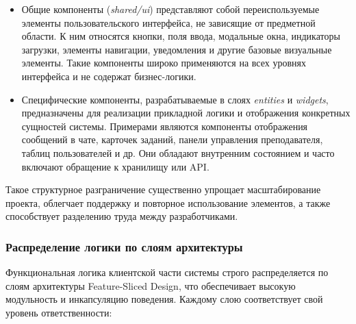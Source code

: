 \begin{itemize}
  \item Общие компоненты (\textit{shared/ui}) представляют собой переиспользуемые элементы пользовательского интерфейса, не зависящие от предметной области. К ним относятся кнопки, поля ввода, модальные окна, индикаторы загрузки, элементы навигации, уведомления и другие базовые визуальные элементы. Такие компоненты широко применяются на всех уровнях интерфейса и не содержат бизнес-логики.
  
  \item Специфические компоненты, разрабатываемые в слоях \textit{entities} и \textit{widgets}, предназначены для реализации прикладной логики и отображения конкретных сущностей системы. Примерами являются компоненты отображения сообщений в чате, карточек заданий, панели управления преподавателя, таблиц пользователей и др. Они обладают внутренним состоянием и часто включают обращение к хранилищу или API.
\end{itemize}

Такое структурное разграничение существенно упрощает масштабирование проекта, облегчает поддержку и повторное использование элементов, а также способствует разделению труда между разработчиками.

\subsubsection{Распределение логики по слоям архитектуры}

Функциональная логика клиентской части системы строго распределяется по слоям архитектуры Feature-Sliced Design, что обеспечивает высокую модульность и инкапсуляцию поведения. Каждому слою соответствует свой уровень ответственности:

